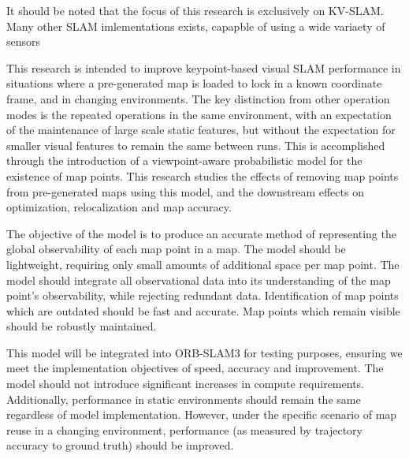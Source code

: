 It should be noted that the focus of this research is exclusively on KV-SLAM. Many other SLAM imlementations exists, capapble of using a wide variaety of sensors


This research is intended to improve keypoint-based visual SLAM performance in situations where a pre-generated map is loaded to lock in a known coordinate frame, and in changing environments. The key distinction from other operation modes is the repeated operations in the same environment, with an expectation of the maintenance of large scale static features, but without the expectation for smaller visual features to remain the same between runs. This is accomplished through the introduction of a viewpoint-aware probabilistic model for the existence of map points. This research studies the effects of removing map points from pre-generated maps using this model, and the downstream effects on optimization, relocalization and map accuracy.


The objective of the model is to produce an accurate method of representing the global observability of each map point in a map. The model should be lightweight, requiring only small amounts of additional space per map point. The model should integrate all observational data into its understanding of the map point's observability, while rejecting redundant data. Identification of map points which are outdated should be fast and accurate. Map points which remain visible should be robustly maintained.


This model will be integrated into ORB-SLAM3 for testing purposes, ensuring we meet the implementation objectives of speed, accuracy and improvement. The model should not introduce significant increases in compute requirements. Additionally, performance in static environments should remain the same regardless of model implementation. However, under the specific scenario of map reuse in a changing environment, performance (as measured by trajectory accuracy to ground truth) should be improved.